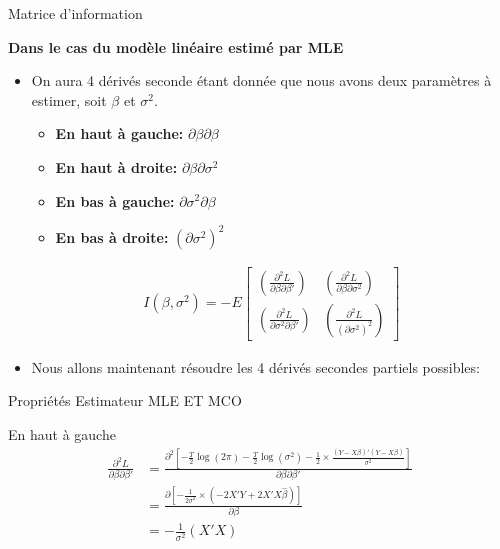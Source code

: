 \documentclass{beamer}
\begin{document}
\begin{frame}{Matrice d'information}

\textbf{Dans le cas du modèle linéaire estimé par MLE}
\begin{itemize}
\item On aura 4 dérivés seconde étant donnée que nous avons deux paramètres à estimer, soit $\beta$ et $\sigma^2$.
\begin{itemize}
\item \textbf{En haut à gauche:} $\partial \beta \partial \beta$
\item \textbf{En haut à droite:} $\partial \beta \partial \sigma^2$
\item \textbf{En bas à gauche:} $\partial \sigma^2 \partial \beta$
\item \textbf{En bas à droite:} $(\partial \sigma^2)^2$
\end{itemize}

\begin{align*}
I(\beta, \sigma^2) = -E\begin{bmatrix}
\left( \frac{\partial^2 L}{\partial \beta \partial \beta'}\right) & \left( \frac{\partial^2 L}{\partial \beta \partial \sigma^2}\right) \\
\left( \frac{\partial^2 L}{\partial \sigma^2 \partial \beta'}\right) & \left( \frac{\partial^2 L}{(\partial \sigma^2)^2}\right)
\end{bmatrix}
\end{align*}
\item Nous allons maintenant résoudre les 4 dérivés secondes partiels possibles:
\end{itemize}

\end{frame}

\begin{frame}{Propriétés Estimateur MLE ET MCO}
\begin{block}{En haut à gauche}
\begin{align*}
\frac{\partial^2 L}{\partial \beta \partial \beta'} & =\frac{\partial^2 \left[ -\frac{T}{2} \log (2 \pi) -\frac{T}{2} \log (\sigma^2)-\frac{1}{2} \times \frac{(Y-X \beta)'(Y-X \beta)}{\sigma^2} \right]}{\partial \beta \partial \beta'}  \\ & = \frac{\partial \left[-\frac{1}{2 \sigma^2} \times (-2X'Y+2X'X \hat{\beta}) \right]}{\partial \beta} \\ & = -\frac{1}{\sigma^2}(X'X)
\end{align*}
\end{block}

\end{frame}
\end{document}
